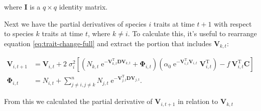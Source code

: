\noindent where $\mathbf{I}$ is a $q \times q$ identity matrix.


Next we have the partial derivatives of species $i$ traits at time $t+1$ with respect to 
species $k$ traits at time $t$, where $k \ne i$.
To calculate this, it's useful to rearrange equation \ref{eq:trait-change-full} and
extract the portion that includes $\mathbf{V}_{k,t}$:


\begin{equation*}
\begin{split}
    \mathbf{V}_{i,t+1} &= \mathbf{V}_{i,t} + 2 \; \sigma_i^2
    \left[
        \left(
            N_{k,t} \; \textrm{e}^{ -\mathbf{V}_{k,t}^{\textrm{T}} \mathbf{D}
            \mathbf{V}_{k,t} } + \mathbf{\Phi}_{i,t}
        \right)
        \left(
            \alpha_0 \; \textrm{e}^{-\mathbf{V}_{i,t}^{\textrm{T}}
            \mathbf{V}_{i,t} } \; \mathbf{V}_{i,t}^{\textrm{T}}
        \right)
        - f \: \mathbf{V}_{i,t}^{\textrm{T}} \mathbf{C}
    \right] \\
    \mathbf{\Phi}_{i,t} &= N_{i,t} + \sum_{j \ne i, j \ne k}^{n}{
        N_{j,t} \; \textrm{e}^{- \mathbf{V}_{j,t}^{\textrm{T}}
        \mathbf{D} \mathbf{V}_{j,t} } }
    \textrm{.}
\end{split}
\end{equation*}

From this we calculated the partial derivative of $\mathbf{V}_{i,t+1}$ in relation to
$\mathbf{V}_{k,t}$


